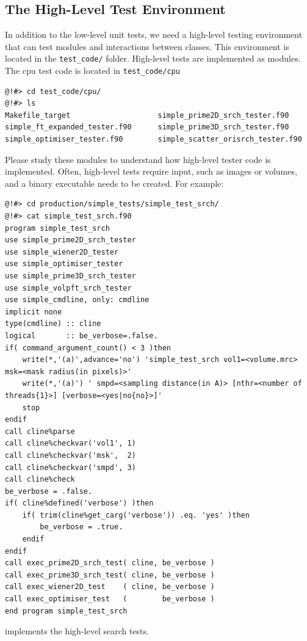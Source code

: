 \documentclass[a4paper,11pt]{article}
\begin{document}
\subsection{The High-Level Test Environment}
In addition to the low-level unit tests, we need a high-level testing environment that can test modules and interactions between classes. This environment is located in the \texttt{test\_code/} folder. High-level tests are implemented as modules. The cpu test code is located in \texttt{test\_code/cpu}
\begin{verbatim}
@!#> cd test_code/cpu/
@!#> ls
Makefile_target                    simple_prime2D_srch_tester.f90
simple_ft_expanded_tester.f90      simple_prime3D_srch_tester.f90
simple_optimiser_tester.f90        simple_scatter_orisrch_tester.f90
\end{verbatim}
Please study these modules to understand how high-level tester code is implemented. Often, high-level tests require input, such as images or volumes, and a binary executable needs to be created. For example:
\begin{verbatim}
@!#> cd production/simple_tests/simple_test_srch/
@!#> cat simple_test_srch.f90 
program simple_test_srch
use simple_prime2D_srch_tester
use simple_wiener2D_tester
use simple_optimiser_tester
use simple_prime3D_srch_tester
use simple_volpft_srch_tester
use simple_cmdline, only: cmdline
implicit none
type(cmdline) :: cline
logical       :: be_verbose=.false.
if( command_argument_count() < 3 )then
    write(*,'(a)',advance='no') 'simple_test_srch vol1=<volume.mrc> msk=<mask radius(in pixels)>'
    write(*,'(a)') ' smpd=<sampling distance(in A)> [nthr=<number of threads{1}>] [verbose=<yes|no{no}>]'
    stop
endif
call cline%parse
call cline%checkvar('vol1', 1)
call cline%checkvar('msk',  2)
call cline%checkvar('smpd', 3)
call cline%check
be_verbose = .false.
if( cline%defined('verbose') )then
    if( trim(cline%get_carg('verbose')) .eq. 'yes' )then
        be_verbose = .true.
    endif
endif
call exec_prime2D_srch_test( cline, be_verbose )
call exec_prime3D_srch_test( cline, be_verbose )
call exec_wiener2D_test    ( cline, be_verbose )
call exec_optimiser_test   (        be_verbose )
end program simple_test_srch
\end{verbatim}
implements the high-level search tests.
\end{document}

